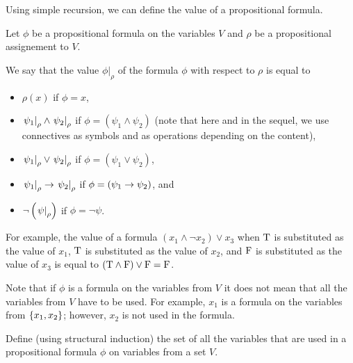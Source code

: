 Using simple recursion, we can define the value of a propositional formula.
\begin{definition}
  Let $\phi$ be a propositional formula on the variables $V$ and
  $\rho$ be a propositional assignement to $V$.

  We say that the value $\phi\big\rvert_\rho$ of the
  formula $\phi$ with respect to $\rho$ is equal to
  \begin{itemize}
    \item $\rho(x)$ if $\phi = x$,
    \item $\left. {\psi_1} \right\rvert_{\rho} \land
      \left. {\psi_2} \right\rvert_{\rho}$ if
      $\phi = (\psi_1 \land \psi_2)$ (note that here and in the
      sequel, we use connectives as symbols and as operations depending on
      the content),
    \item $\left. {\psi_1} \right\rvert_{\rho} \lor
      \left. {\psi_2} \right\rvert_{\rho}$ if
      $\phi = (\psi_1 \lor \psi_2)$,
    \item $\left. {\psi_1} \right\rvert_{\rho} \rightarrow
      \left. {\psi_2} \right\rvert_{\rho}$ if
      $\phi = (\psi_1 \rightarrow \psi_2)$, and
    \item $\lnot\left(\left. {\psi} \right\rvert_{\rho}\right)$
      if $\phi = \lnot \psi$.
  \end{itemize}
\end{definition}

For example, the value of a formula $(x_1 \land \lnot x_2) \lor x_3$ when
$\text{T}$ is substituted as the value of $x_1$,
$\text{T}$ is substituted as the value of $x_2$,
and $\text{F}$ is substituted as the value of $x_3$ is equal to
$(\text{T} \land \text{F}) \lor \text{F} = \text{F}$.


Note that if $\phi$ is a formula on the variables from $V$ it does not mean that
all the variables from $V$ have to be used.
For example, $x_1$ is a formula on the variables from $\set{x_1, x_2}$; however,
$x_2$ is not used in the formula.

\begin{exercise}
  Define (using structural induction) the set of all the variables that are
  used in a propositional formula $\phi$ on variables from a set $V$.
\end{exercise}

